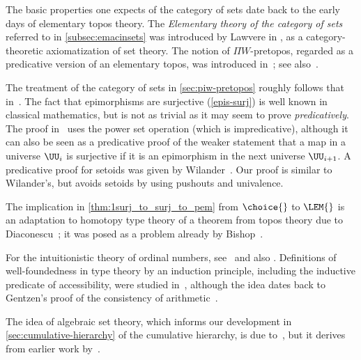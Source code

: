 %

\sectionNotes

The basic properties one expects of the category of sets date back to the early days of elementary topos theory.
The \emph{Elementary theory of the category of sets} referred to in \cref{subsec:emacinsets} was introduced by Lawvere in
\cite{lawvere:etcs-long}, as a category-theoretic axiomatization of set theory.
%
The notion of $\Pi W$-pretopos, regarded as a predicative version of an elementary topos, was introduced in~\cite{MoerdijkPalmgren2002}; see also~\cite{palmgren:cetcs}.

The treatment of the category of sets in \cref{sec:piw-pretopos} roughly follows that in~\cite{RijkeSpitters}.
The fact that epimorphisms are surjective (\cref{epis-surj}) is well known in classical mathematics, but is not as trivial as it may seem to prove \emph{predicatively}.
%
The proof in~\cite{Mines/R/R:1988} uses the power set operation (which is impredicative), although it can also be seen as a predicative proof of the weaker statement that a map in a universe $\UU_i$ is surjective if it is an epimorphism in the next universe $\UU_{i+1}$.
A predicative proof for setoids was given by Wilander~\cite{Wilander2010}.
Our proof is similar to Wilander's, but avoids setoids by using pushouts and univalence.

The implication in \cref{thm:1surj_to_surj_to_pem} from $\choice{}$ to $\LEM{}$ is an adaptation to homotopy type
theory of a theorem from topos theory due to Diaconescu~\cite{Diaconescu}; it was posed as a problem already by Bishop~\cite[Problem~2]{Bishop1967}.

For the intuitionistic theory of ordinal numbers, see~\cite{taylor:ordinals,Taylor99} and also \cite{JoyalMoerdijk1995}.
Definitions of well-foundedness in type theory by an induction principle, including the inductive predicate of accessibility, were studied in~\cite{Huet80,Paulson86,Nordstrom88}, although the idea dates back to Gentzen's proof of the consistency of arithmetic~\cite{Gentzen36}.

The idea of algebraic set theory, which informs our development in \cref{sec:cumulative-hierarchy} of the cumulative hierarchy, is due to~\cite{JoyalMoerdijk1995}, but it derives from earlier work by~\cite{AczelCZF}.
%
%


